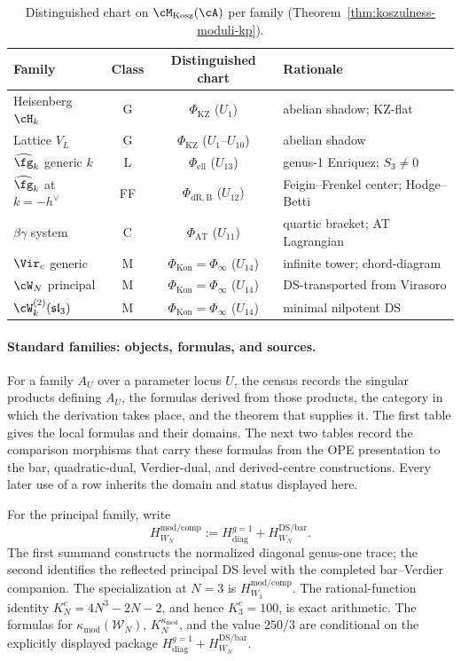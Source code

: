 \begin{table}[ht]
\centering
\caption{Distinguished chart on
 $\cM_{\mathrm{Kosz}}(\cA)$ per family
 (Theorem~\ref{thm:koszulness-moduli-kp}).}
\label{tab:master-invariants-chart}
\renewcommand{\arraystretch}{1.3}
\begin{tabular}{lccl}
\toprule
Family & Class & Distinguished chart & Rationale \\
\midrule
Heisenberg $\cH_k$ & G & $\Phi_{\mathrm{KZ}}$ ($U_1$)
 & abelian shadow; KZ-flat \\
Lattice $V_L$ & G & $\Phi_{\mathrm{KZ}}$ ($U_1$--$U_{10}$)
 & abelian shadow \\
$\widehat{\fg}_k$ generic $k$ & L & $\Phi_{\mathrm{ell}}$ ($U_{13}$)
 & genus-1 Enriquez; $S_3\neq 0$ \\
$\widehat{\fg}_k$ at $k=-h^\vee$ & FF & $\Phi_{\mathrm{dR,B}}$ ($U_{12}$)
 & Feigin--Frenkel center; Hodge--Betti \\
$\beta\gamma$ system & C & $\Phi_{\mathrm{AT}}$ ($U_{11}$)
 & quartic bracket; AT Lagrangian \\
$\Vir_c$ generic & M & $\Phi_{\mathrm{Kon}} = \Phi_\infty$ ($U_{14}$)
 & infinite tower; chord-diagram \\
$\cW_N$ principal & M & $\Phi_{\mathrm{Kon}} = \Phi_\infty$ ($U_{14}$)
 & DS-transported from Virasoro \\
$\cW^{(2)}_k(\mathfrak{sl}_3)$ & M & $\Phi_{\mathrm{Kon}} = \Phi_\infty$ ($U_{14}$)
 & minimal nilpotent DS \\
\bottomrule
\end{tabular}
\end{table}

\paragraph{Standard families: objects, formulas, and sources.}
\label{par:standard-family-source-data}
For a family \(A_U\) over a parameter locus \(U\), the census records
the singular products defining \(A_U\), the formulas derived from
those products, the category in which the derivation takes place, and
the theorem that supplies it.  The first table gives the local
formulas and their domains.  The next two tables record the comparison
morphisms that carry these formulas from the OPE presentation to the
bar, quadratic-dual, Verdier-dual, and derived-centre constructions.
Every later use of a row inherits the domain and status displayed
here.

For the principal family, write
\[
 H_{W_N}^{\mathrm{mod/comp}}
 :=H_{\mathrm{diag}}^{g=1}+H_{W_N}^{\mathrm{DS/bar}}.
\]
The first summand constructs the normalized diagonal genus-one trace;
the second identifies the reflected principal DS level with the
completed bar--Verdier companion.  The specialization at \(N=3\) is
\(H_{W_3}^{\mathrm{mod/comp}}\).
The rational-function identity
\(K_N^c=4N^3-2N-2\), and hence \(K_3^c=100\), is exact arithmetic.
The formulas for \(\kappa_{\mathrm{mod}}(\mathcal W_N)\),
\(K_N^{\kappa_{\mathrm{mod}}}\), and the value \(250/3\) are conditional
on the explicitly displayed package
\(H_{\mathrm{diag}}^{g=1}+H_{W_N}^{\mathrm{DS/bar}}\).

